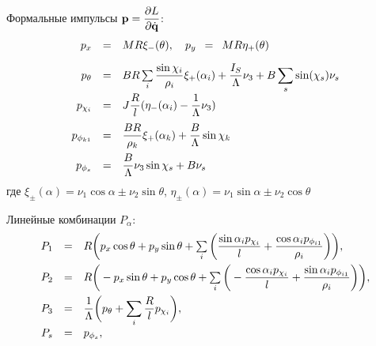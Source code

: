Формальные импульсы $\boldsymbol{\mathbf{p}} = \displaystyle\frac{\displaystyle \partial L}{\displaystyle \partial \dot{\boldsymbol{\mathbf{q}}}}$:
\begin{equation}\label{p}
    \begin{array}{rcl}
        p_x & = & MR\xi_-(\theta), \quad p_y \enspace = \enspace MR\eta_+(\theta)\vsp
        p_\theta & = & BR\sum\limits_i\ddfrac{\sin\chi_i}{\rho_i}\xi_+(\alpha_i) + \ddfrac{I_S}{\Lambda}\nu_3 + B\sum\limits_s\sin(\chi_s)\nu_s\vsp
        p_{\chi_i} & = & J\ddfrac{R}{l}(\eta_-(\alpha_i) - \ddfrac{1}{\Lambda}\nu_3)\vsp
        p_{\phi_{k1}} & = & \ddfrac{BR}{\rho_k}\xi_+(\alpha_k)+\ddfrac{B}{\Lambda}\sin\chi_k\vsp
        p_{\phi_s} & = & \ddfrac{B}{\Lambda}\nu_3\sin\chi_s + B\nu_s
    \end{array}
\end{equation}
где $\xi_\pm(\alpha) = \nu_1\cos\alpha \pm \nu_2\sin\theta$, $\eta_\pm(\alpha) = \nu_1\sin\alpha \pm \nu_2\cos\theta$
\filbreak

Линейные комбинации $P_\alpha$:
\begin{equation}\label{bigP}
    \begin{array}{rcl}
        P_1 & = & R\bigg(p_x\cos\theta + p_y\sin\theta + \sum\limits_{i}\bigg(\ddfrac{\sin\alpha_ip_{\chi_i}}{l} +  \ddfrac{\cos\alpha_ip_{\phi_{i1}}}{\rho_i}\bigg)\bigg),\vsp
        P_2 & = & R\bigg(-p_x\sin\theta + p_y\cos\theta + \sum\limits_{i}\bigg(-\ddfrac{\cos\alpha_ip_{\chi_i}}{l} +  \ddfrac{\sin\alpha_ip_{\phi_{i1}}}{\rho_i}\bigg)\bigg),\vsp
        P_3 & = & \ddfrac{1}{\Lambda}\bigg(p_\theta + \sum\limits_{i}\ddfrac{R}{l}p_{\chi_i}\bigg),\vsp
        P_s & = & p_{\phi_s},
    \end{array}
\end{equation}

